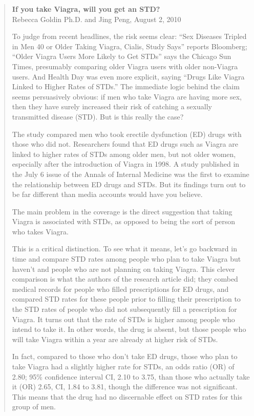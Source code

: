 \documentclass[11pt, chapterprefix=true]{scrbook}\usepackage[]{graphicx}\usepackage[]{color}
\begin{document}
\begin{quotation}
\textbf{If you take Viagra, will you get an STD?} \\
Rebecca Goldin Ph.D. and Jing Peng, August 2, 2010

To judge from recent headlines, the risk seems clear: ``Sex Diseases Tripled in Men 40 or Older Taking Viagra, Cialis, Study Says'' reports Bloomberg; ``Older Viagra Users More Likely to Get STDs'' says the Chicago Sun Times, presumably comparing older Viagra users with older non-Viagra users.  And Health Day was even more explicit, saying ``Drugs Like Viagra Linked to Higher Rates of STDs.''  The immediate logic behind the claim seems persuasively obvious: if men who take Viagra are having more sex, then they have surely increased their risk of catching a sexually transmitted disease (STD). But is this really the case?

The study compared men who took erectile dysfunction (ED) drugs with those who did not.  Researchers found that ED drugs such as Viagra are linked to higher rates of STDs among older men, but not older women, especially after the introduction of Viagra in 1998.  A study published in the July 6 issue of the Annals of Internal Medicine was the first to examine the relationship between ED drugs and STDs. But its findings turn out to be far different than media accounts would have you believe.

The main problem in the coverage is the direct suggestion that taking Viagra is associated with STDs, as opposed to being the sort of person who takes Viagra.

This is a critical distinction. To see what it means, let's go backward in time and
compare STD rates among people who plan to take Viagra but haven't and people who are not planning on taking Viagra. This clever comparison is what the authors of the research article did; they combed medical records for people who filled prescriptions for ED drugs, and compared STD rates for these people prior to filling their prescription to the STD rates of people who did not subsequently fill a prescription for Viagra.  It turns out that the rate of STDs is higher among people who intend to take it.  In other words, the drug is absent, but those people who will take Viagra within a year are already at higher risk of STDs.

In fact, compared to those who don't take ED drugs, those who plan to take Viagra had a slightly higher rate for STDs, an odds ratio (OR) of 2.80; 95\% confidence interval CI, 2.10 to 3.75, than those who actually take it (OR) 2.65, CI, 1.84 to 3.81, though the difference was not significant. This means that the drug had no discernable effect on STD rates for this group of men.
\end{quotation}
\end{document}
